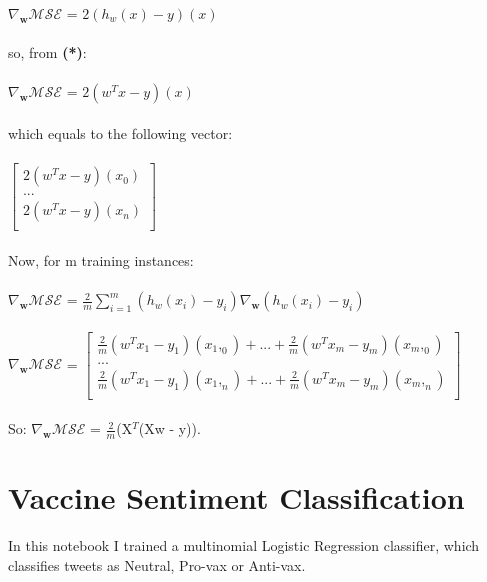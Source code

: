 \documentclass{article}
\begin{document}
$\nabla_{\!\mathbf{w}}\mathcal{MSE} $ = $2(h_w(x) - y)$$(x)$ \\ \\ 
so, from \textbf{(*)}:\\ \\
$\nabla_{\!\mathbf{w}}\mathcal{MSE} $ = $2(w^Tx - y)$$(x)$   \\ \\ 
which equals to the following vector: \\ \\
$
\begin{bmatrix}
2(w^Tx - y)(x_0)\\
. . .\\             
2(w^Tx - y)(x_n)\\
\end{bmatrix}
$ \\ \\
Now, for m training instances: \\ \\ 
$\nabla_{\!\mathbf{w}}\mathcal{MSE} $ = $\frac{2}{m}\sum_{i=1}^{m}(h_w(x_i) - y_i)\nabla_{\!\mathbf{w}}$$(h_w(x_i) - y_i)$ \\ \\
$\nabla_{\!\mathbf{w}}\mathcal{MSE} $ = $\begin{bmatrix}
\frac{2}{m}(w^Tx_1 - y_1)(x_1,_0) + ... + \frac{2}{m}(w^Tx_m - y_m)(x_m,_0) \\
. . .\\             
\frac{2}{m}(w^Tx_1 - y_1)(x_1,_n) + ... + \frac{2}{m}(w^Tx_m - y_m)(x_m,_n)\\
\end{bmatrix}
$ \\ \\ 
So: $\nabla_{\!\mathbf{w}}\mathcal{MSE} $ = $\frac{2}{m}$(X$^T$(Xw - y)).
\section{Vaccine Sentiment Classification}
In this notebook I trained a multinomial Logistic Regression classifier, which classifies tweets as Neutral, Pro-vax or Anti-vax.
\end{document}

